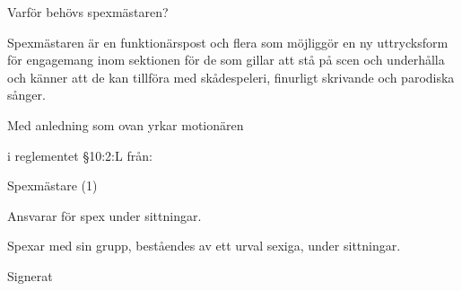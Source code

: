 \documentclass[../_main/handlingar.tex]{subfiles}
\begin{document}
Varför behövs spexmästaren?

Spexmästaren är en funktionärspost och flera som möjliggör en ny uttrycksform för engagemang inom sektionen för de som gillar att stå på scen och underhålla och känner att de kan tillföra med skådespeleri, finurligt skrivande och parodiska sånger.

Med anledning som ovan yrkar motionären
\begin{attsatser}
  \att i reglementet \S10:2:L från:\par
  \begin{emptylist}
    \item Spexmästare (1)
      \begin{dashlist}
        \item Ansvarar för spex under sittningar.
        \item Spexar med sin grupp, beståendes av ett urval sexiga, under sittningar. 
      \end{dashlist}
    \end{emptylist}
    
    
    
    
\end{attsatser}




\begin{signatures}{1}
    Signerat
    \signature{Adam Ekblom}{}

\end{signatures}
\end{document}

